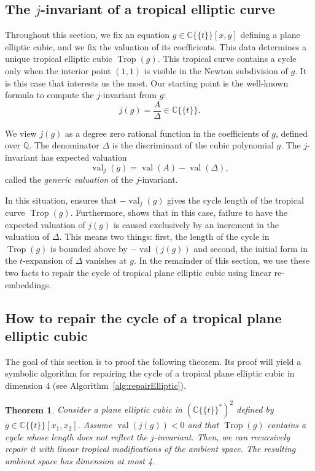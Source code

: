 \documentclass[11pt]{amsart}
\numberwithin{equation}{section}
\theoremstyle{plain}
\newtheorem{theorem}{Theorem}[section]
\theoremstyle{definition}
\theoremstyle{remark}
\begin{document}
\subsection{The $j$-invariant of a tropical elliptic curve}\label{ssec:known-results-about}
Throughout this section, we fix an equation $g\in {{\mathbb{C}}\{\!\{t
\}\!\}}[x,y]$ defining
a plane elliptic  cubic, and we fix the valuation of its
coefficients. This data determines a unique tropical elliptic cubic
$\operatorname{Trop}(g)$.  This tropical curve contains a cycle only when the
interior point $(1,1)$ is visible in the Newton subdivision of $g$. It
is this case that interests us the most.  Our starting point is the
well-known formula to compute the $j$-invariant  from $g$:
\begin{equation}
  \label{eq:4}
  j(g)=\frac{A}{\Delta}\in {{\mathbb{C}}\{\!\{t
\}\!\}}.
\end{equation}

We view $j(g)$ as a degree zero rational function in the coefficients of
$g$, defined over ${\mathbb{Q}}$. The denominator
$\Delta$ is the discriminant of the cubic polynomial $g$.
The $j$-invariant has expected valuation
\[
\operatorname{val}_j(g)=\operatorname{val}(A)-\operatorname{val}(\Delta),
\] called the \emph{generic valuation} of the 
$j$-invariant. 

In this situation, \cite[Theorem 11]{KMM07} ensures that $-\operatorname{val}_j(g)$
gives the cycle length of the tropical curve $\operatorname{Trop}(g)$.  Furthermore,
\cite[Lemma 23]{KMM07} shows that in this case, failure to have the
expected valuation of $j(g)$ is caused exclusively by an increment in
the valuation of $\Delta$. This means two things: first, the length of
the cycle in $\operatorname{Trop}(g)$ is bounded above by $-\operatorname{val} (j(g))$ and second,
the initial form in the $t$-expansion of $\Delta$ vanishes at $g$. In
the remainder of this section, we use these two facts to repair the
cycle of tropical plane elliptic cubic using linear re-embeddings.

\subsection{How to repair the cycle of a tropical plane elliptic  cubic}\label{sec:repair-elliptic}

The goal of this section is to proof the following theorem.  Its proof will yield a symbolic algorithm for repairing the
cycle of a tropical plane elliptic cubic in dimension 4 (see Algorithm~\ref{alg:repairElliptic}).
\begin{theorem}\label{thm:repairEll} Consider a  plane elliptic 
  cubic in $({{\mathbb{C}}\{\!\{t
\}\!\}}^*)^2$ defined by $g\in {{\mathbb{C}}\{\!\{t
\}\!\}}[x_1,x_2]$. Assume
  $\operatorname{val}(j(g))<0$ and that $\operatorname{Trop}(g)$ contains a cycle whose length
  does not reflect the $j$-invariant. Then, we can recursively repair
  it with linear tropical modifications of the ambient space. The
  resulting ambient space has dimension at most 4.
\end{theorem}
\end{document}
